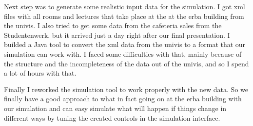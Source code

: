 \par Next step was to generate some realistic input data for the simulation. I got xml files with all rooms and lectures that take place at the at the erba building from the univis. I also tried to get some data from the cafeteria sales from the Studentenwerk, but it arrived just a day right after our final presentation. I builded a Java tool to convert the xml data from the univis to a format that our simulation can work with. I faced some difficulties with that, mainly because of the structure and the incompleteness of the data out of the univis, and so I spend a lot of hours with that.
\par Finally I reworked the simulation tool to work properly with the new data. So we finally have a good approach to what in fact going on at the erba building with our simulation and can easy simulate what will happen if things change in different ways by tuning the created controls in the simulation interface.